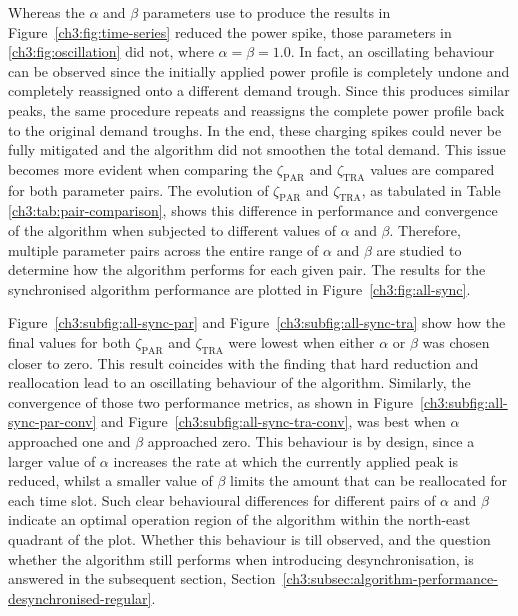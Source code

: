 

Whereas the $\alpha$ and $\beta$ parameters use to produce the results in Figure~\ref{ch3:fig:time-series} reduced the power spike, those parameters in \ref{ch3:fig:oscillation} did not, where $\alpha = \beta = 1.0$.
In fact, an oscillating behaviour can be observed since the initially applied power profile is completely undone and completely reassigned onto a different demand trough.
Since this produces similar peaks, the same procedure repeats and reassigns the complete power profile back to the original demand troughs.
In the end, these charging spikes could never be fully mitigated and the algorithm did not smoothen the total demand.
This issue becomes more evident when comparing the $\zeta_\text{PAR}$ and $\zeta_\text{TRA}$ values are compared for both parameter pairs.
The evolution of $\zeta_\text{PAR}$ and $\zeta_\text{TRA}$, as tabulated in Table \ref{ch3:tab:pair-comparison}, shows this difference in performance and convergence of the algorithm when subjected to different values of $\alpha$ and $\beta$.
Therefore, multiple parameter pairs across the entire range of $\alpha$ and $\beta$ are studied to determine how the algorithm performs for each given pair.
The results for the synchronised algorithm performance are plotted in Figure~\ref{ch3:fig:all-sync}.



Figure~\ref{ch3:subfig:all-sync-par} and Figure~\ref{ch3:subfig:all-sync-tra} show how the final values for both $\zeta_\text{PAR}$ and $\zeta_\text{TRA}$ were lowest when either $\alpha$ or $\beta$ was chosen closer to zero.
This result coincides with the finding that hard reduction and reallocation lead to an oscillating behaviour of the algorithm.
Similarly, the convergence of those two performance metrics, as shown in Figure~\ref{ch3:subfig:all-sync-par-conv} and Figure~\ref{ch3:subfig:all-sync-tra-conv}, was best when $\alpha$ approached one and $\beta$ approached zero.
This behaviour is by design, since a larger value of $\alpha$ increases the rate at which the currently applied peak is reduced, whilst a smaller value of $\beta$ limits the amount that can be reallocated for each time slot.
Such clear behavioural differences for different pairs of $\alpha$ and $\beta$ indicate an optimal operation region of the algorithm within the north-east quadrant of the plot.
Whether this behaviour is till observed, and the question whether the algorithm still performs when introducing desynchronisation, is answered in the subsequent section, Section~\ref{ch3:subsec:algorithm-performance-desynchronised-regular}.


